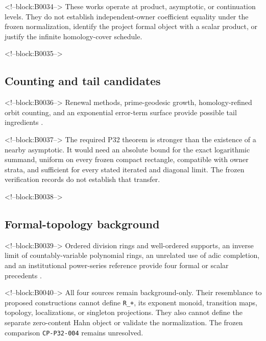 \documentclass[11pt]{article}
\begin{document}
<!--block:B0034-->
These works operate at product, asymptotic, or continuation levels. They
do not establish independent-owner coefficient equality under the frozen
normalization, identify the project formal object with a scalar product,
or justify the infinite homology-cover schedule.

<!--block:B0035-->
\hypertarget{24-counting-and-tail-candidates}{%
\subsection{Counting and tail
candidates}\label{24-counting-and-tail-candidates}}

<!--block:B0036-->
Renewal methods, prime-geodesic growth, homology-refined orbit counting,
and an exponential error-term surface provide possible tail ingredients
\citep{P32-S19,P32-S20,P32-S21,P32-S22}.

<!--block:B0037-->
The required P32 theorem is stronger than the existence of a nearby
asymptotic. It would need an absolute bound for the exact logarithmic
summand, uniform on every frozen compact rectangle, compatible with
owner strata, and sufficient for every stated iterated and diagonal
limit. The frozen verification records do not establish that transfer.

<!--block:B0038-->
\hypertarget{25-formal-topology-background}{%
\subsection{Formal-topology
background}\label{25-formal-topology-background}}

<!--block:B0039-->
Ordered division rings and well-ordered supports, an inverse limit of
countably-variable polynomial rings, an unrelated use of adic
completion, and an institutional power-series reference provide four
formal or scalar precedents
\citep{P32-S23,P32-S24,P32-S25,P32-S26}.

<!--block:B0040-->
All four sources remain background-only. Their resemblance to proposed
constructions cannot define \texttt{R\_+}, its exponent monoid,
transition maps, topology, localizations, or singleton projections. They
also cannot define the separate zero-content Hahn object or validate the
normalization. The frozen comparison \texttt{CP-P32-004} remains
unresolved.
\end{document}
